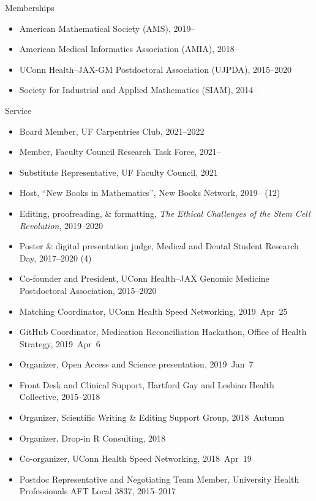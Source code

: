 \documentclass[10pt,a4paper]{article}
\begin{document}
\vspace{.25cm}
{\sc Memberships}
\begin{itemize}[label=$\circ$,nolistsep]
\item
American Mathematical Society (AMS), 2019--
\item
American Medical Informatics Association (AMIA), 2018--
\item
UConn Health--JAX-GM Postdoctoral Association (UJPDA), 2015--2020
\item
Society for Industrial and Applied Mathematics (SIAM), 2014--
\end{itemize}

\vspace{.25cm}
{\sc Service}
\begin{itemize}[label=$\circ$,nolistsep]
\item
Board Member, UF Carpentries Club, 2021--2022
\item
Member, Faculty Council Research Task Force, 2021--
\item
Substitute Representative, UF Faculty Council, 2021
\item
Host, ``New Books in Mathematics'', New Books Network, 2019-- (12)
\item
Editing, proofreading, \& formatting, {\itshape The Ethical Challenges of the Stem Cell Revolution}, 2019--2020
\item
Poster \& digital presentation judge, Medical and Dental Student Research Day, 2017--2020 (4)
\item
Co-founder and President, UConn Health--JAX Genomic Medicine Postdoctoral Association, 2015--2020
\item
Matching Coordinator, UConn Health Speed Networking, 2019~Apr~25
\item
GitHub Coordinator, Medication Reconciliation Hackathon, Office of Health Strategy, 2019~Apr~6
\item
Organizer, Open Access and Science presentation, 2019~Jan~7
\item
Front Desk and Clinical Support, Hartford Gay and Lesbian Health Collective, 2015--2018
\item
Organizer, Scientific Writing \& Editing Support Group, 2018~Autumn
\item
Organizer, Drop-in R Consulting, 2018
\item
Co-organizer, UConn Health Speed Networking, 2018~Apr~19
\item
Postdoc Representative and Negotiating Team Member, University Health Professionals AFT Local 3837, 2015--2017

\end{itemize}
\end{document}
